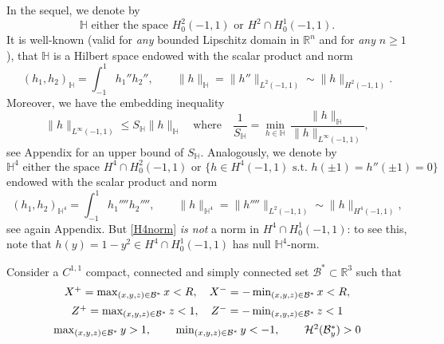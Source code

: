 \documentclass[11pt,a4paper]{amsart}
\def\R{\mathbb{R}}
\theoremstyle{remark}
\theoremstyle{definition}
\numberwithin{equation}{section}
\numberwithin{proposition}{section}
\begin{document}
	In the sequel, we denote by
	\begin{equation*}
		\mathbb{H}\mbox{ either the space }H_0^2(-1,1)\mbox{ or }H^2\cap H_0^1(-1,1).
	\end{equation*}
	It is well-known \cite[Theorem 2.31]{GGSbook} (valid for {\em any} bounded Lipschitz domain in $\R^n$ and for {\em any} $n\ge1$), that
	 $\mathbb{H}$ is a Hilbert space endowed with the scalar product and norm
	\begin{equation}\label{Hnorm}(h_1, h_2)_{\mathbb{H}}= \int_{-1}^1 h_1'' h_2'', \qquad   \|h\|_\mathbb{H}=\|h''\|_{L^2(-1,1)}\sim \|h\|_{H^2(-1,1)}. \end{equation}
Moreover, we have the embedding inequality
\begin{equation}\label{SH-embedding}
\|h\|_{L^\infty(-1,1)}\leq S_{\mathbb{H}}\|h\|_{\mathbb{H}} \quad \text{where} \quad \frac{1}{S_{\mathbb{H}}}=\min_{h\in\mathbb{H}}\, \frac{\|h\|_{\mathbb{H}}}{\|h\|_{L^\infty(-1,1)}},
    \end{equation}see Appendix for an upper bound of $S_\mathbb{H}$.
Analogously, we denote by
\begin{equation*}
		\mathbb{H}^4\mbox{ either the space $H^4\cap H^2_0(-1,1)$ or $\{h\in H^4(-1,1)$ s.t. $h(\pm 1)=h''(\pm1)=0 \}$}
	\end{equation*} endowed with the scalar product and norm
	\begin{equation}\label{H4norm}(h_1, h_2)_{\mathbb{H}^4}= \int_{-1}^1 h_1'''' h_2'''', \qquad   \|h\|_{\mathbb{H}^4}=\|h''''\|_{L^2(-1,1)}\sim \|h\|_{H^4(-1,1)},\end{equation} see again Appendix. But \eqref{H4norm} \emph{is not} a norm in $H^4 \cap H^1_0(-1,1)$: to see this, note that $h(y)=1-y^2 \in H^4 \cap H^1_0(-1,1)$ has null $\mathbb{H}^4$-norm.\par
	Consider a $C^{1,1}$ compact, connected and simply connected set $\mathcal{B}^*\subset\mathbb{R}^3$ such that
	\begin{equation}\label{B*}\begin{array}{c}
			X^+=\max_{(x,y,z)\in\mathcal{B}^*}x<R, \quad X^-=-\min_{(x,y,z)\in\mathcal{B}^*}x<R,\\[5pt]
			
			Z^+=\max_{(x,y,z)\in\mathcal{B}^*}z<1, \quad Z^-=-\min_{(x,y,z)\in\mathcal{B}^*}z<1 	\\[5pt]
			
			\max_{(x,y,z)\in\mathcal{B}^*}y>1,\hspace{.3in} \min_{(x,y,z)\in\mathcal{B}^*}y<-1,\hspace{.3in}\mathcal{H}^2(\mathcal{B}_y^*)>0
		\end{array}
	\end{equation}
\end{document}
